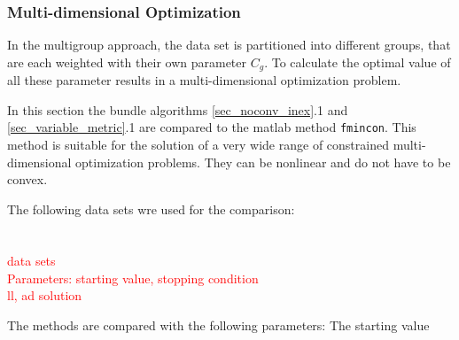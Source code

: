\subsubsection{Multi-dimensional Optimization}

In the multigroup approach, the data set is partitioned into different groups, that are each weighted with their own parameter \(C_g\).
To calculate the optimal value of all these parameter results in a multi-dimensional optimization problem.

In this section the bundle algorithms \ref{sec_noconv_inex}.1 and \ref{sec_variable_metric}.1 are compared to the matlab method \texttt{fmincon}. This method is suitable for the solution of a very wide range of constrained multi-dimensional optimization problems. They can be nonlinear and do not have to be convex.

The following data sets wre used for the comparison:

\begin{table}%
\begin{tabular}{lcr}

\end{tabular}
\caption[]{}
\label{}
\end{table}

\textcolor{red}{data sets\\
Parameters: starting value, stopping condition \\
ll, ad solution \\
}

The methods are compared with the following parameters: The starting value 











